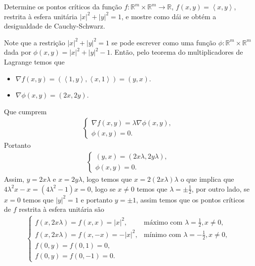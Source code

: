 \begin{homeworkProblem}[Seção 3-5]
  Determine os pontos críticos da função $f:\mathbb{R}^{m}\times\mathbb{R}^{m}\to\mathbb{R}$, $f(x,y)=\left\langle x,y \right\rangle$, restrita à esfera unitária $|x|^{2}+|y|^{2}=1$, e mostre como dái se obtém a desigualdade de Cauchy-Schwarz.
  \begin{solution}
    Note que a restrição $|x|^{2}+|y|^{2}=1$ se pode escrever como uma função $\phi:\mathbb{R}^{m}\times\mathbb{R}^{m}$ dada por $\phi(x,y)=|x|^{2}+|y|^{2}-1$. Então, pelo teorema do multiplicadores de Lagrange temos que
    \begin{itemize}
      \item $\nabla f(x,y)=\left( \left\langle 1,y \right\rangle,\left\langle x,1 \right\rangle \right)=\left( y,x \right)$.
      \item $\nabla \phi(x,y)=\left( 2x,2y \right)$.
    \end{itemize}
    Que cumprem
    \begin{align*}
      \begin{cases}
        \nabla f(x,y)=\lambda\nabla\phi(x,y),\\
        \phi(x,y)=0.
      \end{cases}
    \end{align*}
    Portanto
    \begin{align*}
      \begin{cases}
        \left( y,x \right)=\left( 2x\lambda,2y\lambda \right),\\
        \phi(x,y)=0.
      \end{cases}
    \end{align*}
    Assim, $y=2x\lambda$ e $x=2y\lambda$, logo temos que $x=2(2x\lambda)\lambda$ o que implica que $4\lambda^{2}x-x=(4\lambda^{2}-1)x=0$, logo se $x\neq 0$ temos que $\lambda=\pm\frac{1}{2}$, por outro lado, se $x=0$ temos que $|y|^{2}=1$ e portanto $y=\pm 1$, assim temos que os pontos críticos de $f$ restrita à esfera unitária são
    \begin{align*}
      \begin{cases}
        f(x,2x\lambda)=f(x,x)=|x|^{2}, &\text{máximo com } \lambda=\frac{1}{2},x\neq 0 \text{,} \\
        f(x,2x\lambda)=f(x,-x)=-|x|^{2}, &\text{mínimo com } \lambda=-\frac{1}{2},x\neq 0,\\
        f(0,y)=f(0,1)=0,\\
        f(0,y)=f(0,-1)=0.
      \end{cases}
    \end{align*}

\end{solution}
\end{homeworkProblem}
